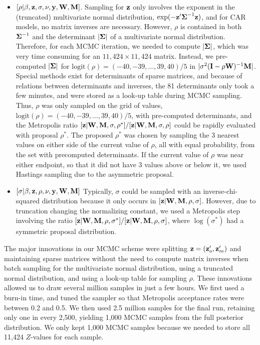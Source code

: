 \documentclass[11pt, titlepage]{article}
\begin{document}
\begin{spacing}{1.9}
\begin{flushleft}
\begin{itemize}
  \item $[\rho|\beta,\mathbf{z},\sigma,\nu,\mathbf{y},\mathbf{W},\mathbf{M}]$. Sampling for $\mathbf{z}$ only involves the exponent in the (truncated) multivariate normal distribution, $\exp(-\mathbf{z}^{\prime}\mbox{\boldmath $\Sigma$}^{-1}\mathbf{z})$, and for CAR models, no matrix inverses are necessary.  However, $\rho$ is contained in both $\mbox{\boldmath $\Sigma$}^{-1}$ and the determinant $|\mbox{\boldmath $\Sigma$}|$ of a multivariate normal distribution.  Therefore, for each MCMC iteration, we needed to compute $|\mbox{\boldmath $\Sigma$}|$, which was very time consuming for an $11,424 \times 11,424$ matrix.  Instead, we pre-computed $|\mbox{\boldmath $\Sigma$}|$ for $\textrm{logit}(\rho) = (-40, -39, \ldots, 39, 40)/5$ in $|\sigma^{2}(\mathbf{I} - \rho\mathbf{W})^{-1}\mathbf{M}|$.  Special methods exist for determinants of sparse matrices, and because of relations between determinants and inverses, the 81 determinants only took a few minutes, and were stored as a look-up table during MCMC sampling.  Thus, $\rho$ was only sampled on the grid of values, $\textrm{logit}(\rho) = (-40, -39, \ldots, 39, 40)/5$, with pre-computed determinants, and the Metropolis ratio $[\mathbf{z}|\mathbf{W},\mathbf{M},\sigma,\rho^{*}]/[\mathbf{z}|\mathbf{W},\mathbf{M},\sigma,\rho]$ could be rapidly evaluated with proposal $\rho^{*}$.  The proposed $\rho^{*}$ was chosen by sampling the 3 nearest values on either side of the current value of $\rho$, all with equal probability, from the set with precomputed determinants.  If the current value of $\rho$ was near either endpoint, so that it did not have 3 values above or below it, we used Hastings sampling due to the asymmetric proposal.
  \item $[\sigma|\beta,\mathbf{z},\rho,\nu,\mathbf{y},\mathbf{W},\mathbf{M}]$  Typically, $\sigma$ could be sampled with an inverse-chi-squared distribution \citep{gelman_bayesian_2013} because it only occurs in $[\mathbf{z}|\mathbf{W},\mathbf{M},\rho,\sigma]$. However, due to truncation changing the normalizing constant, we used a Metropolis step involving the ratio $[\mathbf{z}|\mathbf{W},\mathbf{M},\rho,\sigma^{*}]/[\mathbf{z}|\mathbf{W},\mathbf{M},\rho,\sigma]$, where $\log(\sigma^{*})$ had a symmetric proposal distribution.   

\end{itemize} 

The major innovations in our MCMC scheme were splitting $\mathbf{z} = (\mathbf{z}_{o}^{\prime},\mathbf{z}_{m}^{\prime})$ and maintaining sparse matrices without the need to compute matrix inverses when batch sampling for the multivariate normal distribution, using a truncated normal distribution, and using a look-up table for sampling $\rho$.  These innovations allowed us to draw several million samples in just a few hours.  We first used a burn-in time, and tuned the sampler so that Metropolis acceptance rates were between 0.2 and 0.5.  We then used 2.5 million samples for the final run, retaining only one in every 2,500, yielding 1,000 MCMC samples from the full posterior distribution.  We only kept 1,000 MCMC samples because we needed to store all 11,424 $Z$-values for each sample.


\end{flushleft}
\end{spacing}
\end{document}
